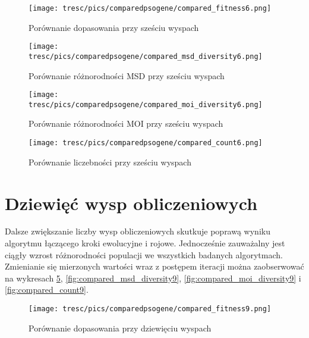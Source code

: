 \clearpage

\begin{figure}[H]
\begin{center} 
\texttt{[image: tresc/pics/comparedpsogene/compared\_fitness6.png]}
\caption{Porównanie dopasowania przy sześciu wyspach}
\label{fig:compared_fintess6}
\end{center}
\end{figure}


\begin{figure}[H]
\begin{center} 
\texttt{[image: tresc/pics/comparedpsogene/compared\_msd\_diversity6.png]}
\caption{Porównanie różnorodności MSD przy sześciu wyspach}
\label{fig:compared_msd_diversity6}
\end{center}
\end{figure}

\begin{figure}[H]
\begin{center} 
\texttt{[image: tresc/pics/comparedpsogene/compared\_moi\_diversity6.png]}
\caption{Porównanie różnorodności MOI przy sześciu wyspach}
\label{fig:compared_moi_diversity6}
\end{center}
\end{figure}

\begin{figure}[H]
\begin{center} 
\texttt{[image: tresc/pics/comparedpsogene/compared\_count6.png]}
\caption{Porównanie liczebności przy sześciu wyspach}
\label{fig:compared_count6}
\end{center}
\end{figure}


\section{Dziewięć wysp obliczeniowych}

Dalsze zwiększanie liczby wysp obliczeniowych skutkuje poprawą wyniku algorytmu łączącego kroki ewolucyjne i rojowe. Jednocześnie zauważalny jest ciągły wzrost różnorodności populacji we wszystkich badanych algorytmach. Zmienianie się mierzonych wartości wraz z postępem iteracji można zaobserwować na wykresach \ref{fig:compared_fintess9}, \ref{fig:compared_msd_diversity9}, \ref{fig:compared_moi_diversity9} i \ref{fig:compared_count9}.





\begin{figure}[H]
\begin{center} 
\texttt{[image: tresc/pics/comparedpsogene/compared\_fitness9.png]}
\caption{Porównanie dopasowania przy dziewięciu wyspach}
\label{fig:compared_fintess9}
\end{center}
\end{figure}

